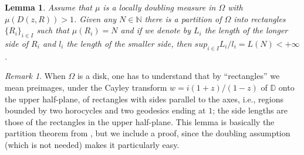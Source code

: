 \documentclass[12pt,twoside,final,psamsfonts]{amsart}
\theoremstyle{plain}
\newtheorem{lema}{Lemma}
\theoremstyle{remark}
\newtheorem*{remark}{Remark}
\theoremstyle{definition}
\newcommand{\N}{{\mathbb N}}
\newcommand{\D}{{\mathbb D}}
\begin{document}
\begin{lema}\label{partition}
Assume that $\mu$ is a locally doubling measure in $\Omega$ with
$\mu(D(z,R))>1$.
Given any $N\in \N$ there is  a partition of $\Omega$ into rectangles
$\{R_i\}_{i\in I}$ such  that  $\mu(R_i)=N$ and if we denote by $L_i$
the length of the longer side of $R_i$ and $l_i$ the 
length of the smaller side,
then  $sup_{i\in I} L_i/l_i=L(N)<+\infty$. 
\end{lema}

\begin{remark} When $\Omega$ is a disk, one has to understand that
by ``rectangles''
we mean preimages, under the Cayley transform $w=i(1+z)/(1-z)$ of $\D$ onto
the upper half-plane, of rectangles with sides parallel to the axes, i.e.,
regions bounded by two horocycles and two geodesics ending at $1$; the side
lengths are those of the rectangles in the upper half-plane. This lemma is basically
the partition theorem from \cite{Yulmukhametov85}, but we include a proof, since
the doubling assumption (which is not needed) makes it particularly easy. 
\end{remark}
\end{document}
